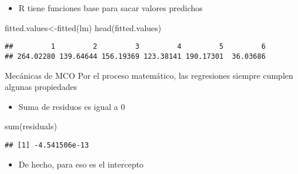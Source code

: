 \documentclass[
  ignorenonframetext,
]{beamer}
\newenvironment{Shaded}{\begin{snugshade}}{\end{snugshade}}
\newcommand{\FunctionTok}[1]{\textcolor[rgb]{0.00,0.00,0.00}{#1}}
\newcommand{\NormalTok}[1]{#1}
\newcommand{\OtherTok}[1]{\textcolor[rgb]{0.56,0.35,0.01}{#1}}
\providecommand{\tightlist}{%
  \setlength{\itemsep}{0pt}\setlength{\parskip}{0pt}}
\begin{document}
\begin{frame}[fragile]{}
\protect\hypertarget{section-9}{}
\begin{itemize}
\tightlist
\item
  R tiene funciones base para sacar valores predichos
\end{itemize}

\begin{Shaded}
\begin{Highlighting}[]
\NormalTok{fitted.values}\OtherTok{\textless{}{-}}\FunctionTok{fitted}\NormalTok{(lm)}
\FunctionTok{head}\NormalTok{(fitted.values)}
\end{Highlighting}
\end{Shaded}

\begin{verbatim}
##         1         2         3         4         5         6 
## 264.02280 139.64644 156.19369 123.38141 190.17301  36.03686
\end{verbatim}
\end{frame}

\begin{frame}[fragile]{Mecánicas de MCO}
\protect\hypertarget{mecuxe1nicas-de-mco}{}
Por el proceso matemático, las regresiones siempre cumplen algunas
propiedades

\begin{itemize}
\tightlist
\item
  Suma de residuos es igual a 0
\end{itemize}

\begin{Shaded}
\begin{Highlighting}[]
\FunctionTok{sum}\NormalTok{(residuals)}
\end{Highlighting}
\end{Shaded}

\begin{verbatim}
## [1] -4.541506e-13
\end{verbatim}

\begin{itemize}
\tightlist
\item
  De hecho, para eso es el intercepto
\end{itemize}
\end{frame}
\end{document}
